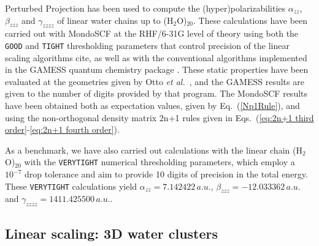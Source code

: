 \documentclass[prl,aps,letterpaper,twocolumn,showpacs,twocolumngrid,superbib]{revtex4}
\begin{document}
Perturbed Projection has been used to compute the (hyper)polarizabilities $\alpha_{zz}$, 
$\beta_{zzz}$ and $\gamma_{zzzz}$ of linear water chains up to (H$_2$O)$_{20}$. 
These calculations have been carried out with {\sc MondoSCF} at the RHF/6-31G level of theory using 
both the {\tt GOOD} and {\tt TIGHT} thresholding parameters that control precision of the 
linear scaling algorithms cite{}, as well as with the conventional algorithms implemented
in the {\sc GAMESS} quantum chemistry package \cite{gamess}.  These static properties have 
been evaluated at the geometries given by Otto {\em et al.}~\cite{POtto99}, and the GAMESS
results are given to the number of digits provided by that program.
The {\sc MondoSCF} results have been obtained both as expectation values, given by Eq.~(\ref{Np1Rule}), 
and using the non-orthogonal density matrix 2n+1 rules given in 
Eqs.~(\ref{eq:2n+1 third order}-\ref{eq:2n+1 fourth order}).

As a benchmark, we have also carried out calculations with the linear chain (H$_2$O)$_{20}$ with 
the {\tt VERYTIGHT} numerical thresholding parameters, which employ a $10^{-7}$ drop tolerance and
aim to provide 10 digits of precision in the total energy.   These {\tt VERYTIGHT} calculations yield  
$\alpha_{zz}=7.142422\,a.u.$, $\beta_{zzz}=-12.033362\,a.u.$ and $\gamma_{zzzz}=1411.425500\,a.u.$. 



\subsection{Linear scaling: 3D water clusters}
\end{document}
